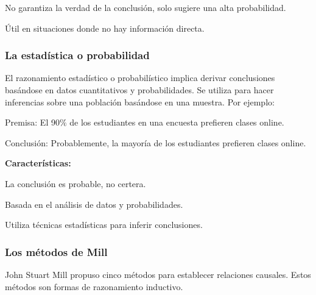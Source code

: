 No garantiza la verdad de la conclusión, solo sugiere una alta probabilidad.

Útil en situaciones donde no hay información directa.

\subsubsection{La estadística o probabilidad}
El razonamiento estadístico o probabilístico implica derivar conclusiones basándose en datos cuantitativos y probabilidades. Se utiliza para hacer inferencias sobre una población basándose en una muestra. Por ejemplo:

Premisa: El 90\(\%\) de los estudiantes en una encuesta prefieren clases online.

Conclusión: Probablemente, la mayoría de los estudiantes prefieren clases online.

\textbf{Características:}

La conclusión es probable, no certera.

Basada en el análisis de datos y probabilidades.

Utiliza técnicas estadísticas para inferir conclusiones.

\subsubsection{Los métodos de Mill}
John Stuart Mill propuso cinco métodos para establecer relaciones causales. Estos métodos son formas de razonamiento inductivo.

